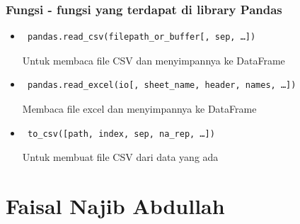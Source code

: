 \subsubsection{Fungsi - fungsi yang terdapat di library Pandas}
\begin{itemize}
	\item \begin{verbatim} pandas.read_csv(filepath_or_buffer[, sep, …]) \end{verbatim} Untuk membaca file CSV dan menyimpannya ke DataFrame
	\item \begin{verbatim} pandas.read_excel(io[, sheet_name, header, names, …])  \end{verbatim} Membaca file excel dan menyimpannya ke DataFrame
	\item \begin{verbatim} to_csv([path, index, sep, na_rep, …]) \end{verbatim}
	Untuk membuat file CSV dari data yang ada	
\end{itemize}


\section{Faisal Najib Abdullah}
